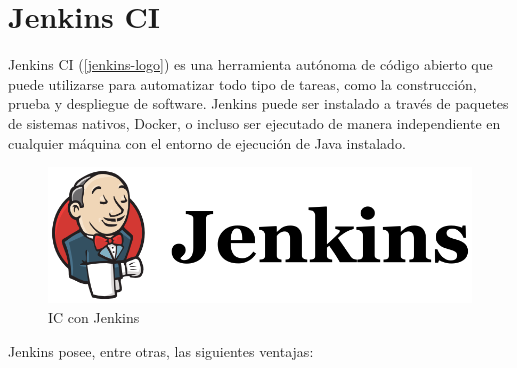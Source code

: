 \section{Jenkins \gls{CI}}

Jenkins \gls{CI} (\autoref{jenkins-logo}) es una herramienta autónoma de código abierto que puede utilizarse para automatizar todo tipo de tareas, como la construcción, prueba y despliegue de software. Jenkins puede ser instalado a través de paquetes de sistemas nativos, Docker, o incluso ser ejecutado de manera independiente en cualquier máquina con el entorno de ejecución de Java instalado\cite{jenkins2017}.


\begin{figure}[htbp]
	\centering
	\includegraphics[width=0.80\linewidth]
	{entorno/figuras/jenkins.png}
	\caption{\gls{IC} con Jenkins}
	\label{jenkins-logo}
\end{figure}

Jenkins posee, entre otras, las siguientes ventajas:

